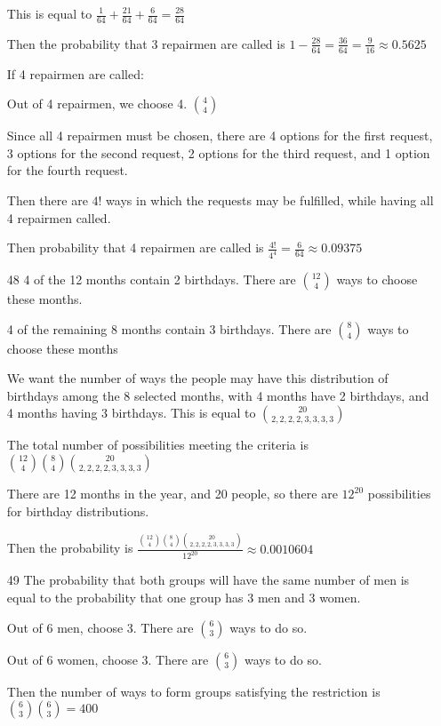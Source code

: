 \documentclass[11pt]{article}
\begin{document}
\begin{itemize}
  This is equal to $\frac{1}{64} + \frac{21}{64} + \frac{6}{64} = \frac{28}{64}$

  Then the probability that 3 repairmen are called is $1 - \frac{28}{64} = \frac{36}{64} = \frac{9}{16} \approx 0.5625$

  If 4 repairmen are called:

  Out of 4 repairmen, we choose 4. $\binom{4}{4}$

  Since all 4 repairmen must be chosen, there are 4 options for the first request, 3 options for the second request, 2 options for the third request, and 1 option for the fourth request.

  Then there are $4!$ ways in which the requests may be fulfilled, while having all 4 repairmen called.

  Then probability that 4 repairmen are called is $\frac{4!}{4^4} = \frac{6}{64} \approx 0.09375$

\item[48]
  4 of the 12 months contain 2 birthdays. There are $\binom{12}{4}$ ways to choose these months.

  4 of the remaining 8 months contain 3 birthdays. There are $\binom{8}{4}$ ways to choose these months

  We want the number of ways the people may have this distribution of birthdays among the 8 selected months, with 4 months have 2 birthdays, and 4 months having 3 birthdays. This is equal to $\binom{20}{2,2,2,2,3,3,3,3}$

  The total number of possibilities meeting the criteria is $\binom{12}{4}\binom{8}{4}\binom{20}{2,2,2,2,3,3,3,3}$


  There are 12 months in the year, and 20 people, so there are $12^{20}$ possibilities for birthday distributions.

  Then the probability is $\frac{\binom{12}{4}\binom{8}{4}\binom{20}{2,2,2,2,3,3,3,3}}{12^{20}} \approx 0.0010604$
  
\item[49]
  The probability that both groups will have the same number of men is equal to the probability that one group has 3 men and 3 women.

  Out of 6 men, choose 3. There are $\binom{6}{3}$ ways to do so.

  Out of 6 women, choose 3. There are $\binom{6}{3}$ ways to do so.

  Then the number of ways to form groups satisfying the restriction is $\binom{6}{3}\binom{6}{3} = 400$


\end{itemize}
\end{document}

